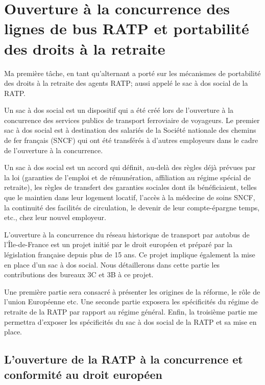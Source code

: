 \chapter{Ouverture à la concurrence des lignes de bus RATP et portabilité des droits à la retraite} %



Ma première tâche, en tant qu'alternant a porté sur les mécanismes de portabilité des droits à la retraite des agents RATP; aussi appelé le sac à dos social de la RATP.

Un sac à dos social est un dispositif qui a été créé lors de l'ouverture à la concurrence des services publics de transport ferroviaire de voyageurs. Le premier sac à dos social est à destination des salariés de la Société nationale des chemins de fer français (SNCF) qui ont été transférés à d'autres employeurs dans le cadre de l'ouverture à la concurrence.

Un sac à dos social est un accord qui définit, au-delà des règles déjà prévues par la loi (garanties de l’emploi et de rémunération, affiliation au régime spécial de retraite), les règles de transfert des garanties sociales dont ils bénéficiaient, telles que le maintien dans leur logement locatif, l’accès à la médecine de soins SNCF, la continuité des facilités de circulation, le devenir de leur compte-épargne temps, etc., chez leur nouvel employeur. 

L'ouverture à la concurrence du réseau historique de transport par autobus de l'Île-de-France est un projet initié par le droit européen et préparé par la législation française depuis plus de 15 ans. Ce projet implique également la mise en place d'un sac à dos social. Nous détaillerons dans cette partie les contributions des bureaux 3C et 3B à ce projet.

Une première partie sera consacré à présenter les origines de la réforme, le rôle de l'union Européenne etc. Une seconde partie exposera les spécificités du régime de retraite de la RATP par rapport au régime général. Enfin, la troisième partie me permettra d'exposer les spécificités du sac à dos social de la RATP et sa mise en place.



\section{L'ouverture de la RATP à la concurrence et conformité au droit européen}

